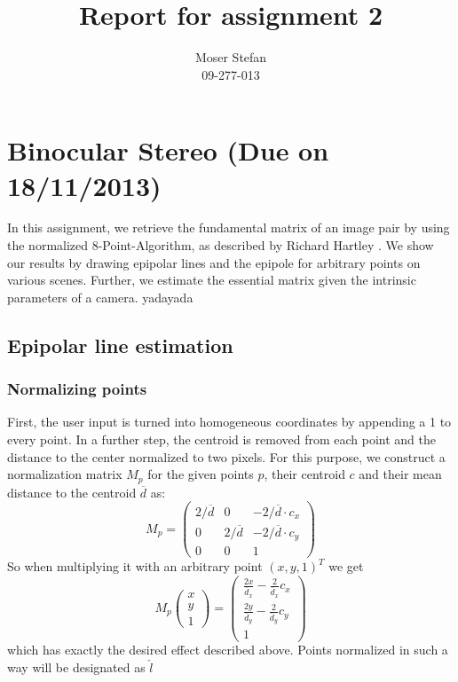 \documentclass{paper}
\title{Report for assignment 2}
\author{Moser Stefan\\09-277-013}
\begin{document}
\maketitle

\section{Binocular Stereo (Due on 18/11/2013)}

In this assignment, we retrieve the fundamental matrix of an image pair by using the normalized 8-Point-Algorithm, as described by Richard Hartley \cite{601246}. We show our results by drawing epipolar lines and the epipole for arbitrary points on various scenes. Further, we estimate the essential matrix given the intrinsic parameters of a camera. yadayada

\subsection{Epipolar line estimation}

\subsubsection{Normalizing points}

First, the user input is turned into homogeneous coordinates by appending a 1 to every point. 
In a further step, the centroid is removed from each point and the distance to the center normalized to two pixels. For this purpose, we construct a normalization matrix $M_p$ for the given points $p$, their centroid $c$ and their mean distance to the centroid $\overline{d}$ as:
\begin{equation}
M_p =
\begin{pmatrix}
	2/\overline{d} & 0 & -2/\overline{d} \cdot c_x \\
	0 & 2/\overline{d} & -2/\overline{d} \cdot c_y \\
	0 & 0 & 1
\end{pmatrix}
\end{equation}
So when multiplying it with an arbitrary point $(x,y,1)^T$ we get
\begin{equation}
M_p \begin{pmatrix}
 x \\
 y \\
 1
\end{pmatrix}
 = \begin{pmatrix}
 	\frac{2x}{\overline{d}_x} - \frac{2}{\overline{d}_x}c_x \\
 	\frac{2y}{\overline{d}_y} - \frac{2}{\overline{d}_y}c_y \\
 	1
 \end{pmatrix}
\end{equation}
which has exactly the desired effect described above. Points normalized in such 
a way will be designated as $\hat{l}$
\end{document}
